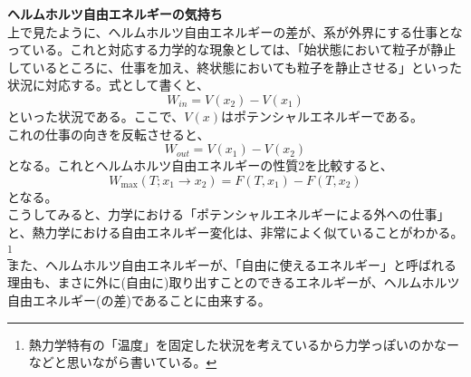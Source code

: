\documentclass[a4paper,11pt]{jsarticle}
\begin{document}
\textbf{ヘルムホルツ自由エネルギーの気持ち}\\
上で見たように、ヘルムホルツ自由エネルギーの差が、系が外界にする仕事となっている。これと対応する力学的な現象としては、「始状態において粒子が静止しているところに、仕事を加え、終状態においても粒子を静止させる」といった状況に対応する。式として書くと、
\begin{equation}
    W_{in} = V(x_2)-V(x_1)
\end{equation}
といった状況である。ここで、$V(x)$はポテンシャルエネルギーである。\\
これの仕事の向きを反転させると、
\begin{equation}
    W_{out} = V(x_1)-V(x_2)
\end{equation}
となる。これとヘルムホルツ自由エネルギーの性質2を比較すると、
\begin{equation}
    W_{\text{max}}(T;x_1\rightarrow x_2) = F(T,x_1)-F(T,x_2)
\end{equation}
となる。\\
こうしてみると、力学における「ポテンシャルエネルギーによる外への仕事」と、熱力学における自由エネルギー変化は、非常によく似ていることがわかる。\footnote{熱力学特有の「温度」を固定した状況を考えているから力学っぽいのかなーなどと思いながら書いている。}\\
また、ヘルムホルツ自由エネルギーが、「自由に使えるエネルギー」と呼ばれる理由も、まさに外に(自由に)取り出すことのできるエネルギーが、ヘルムホルツ自由エネルギー(の差)であることに由来する。\\
\end{document}
